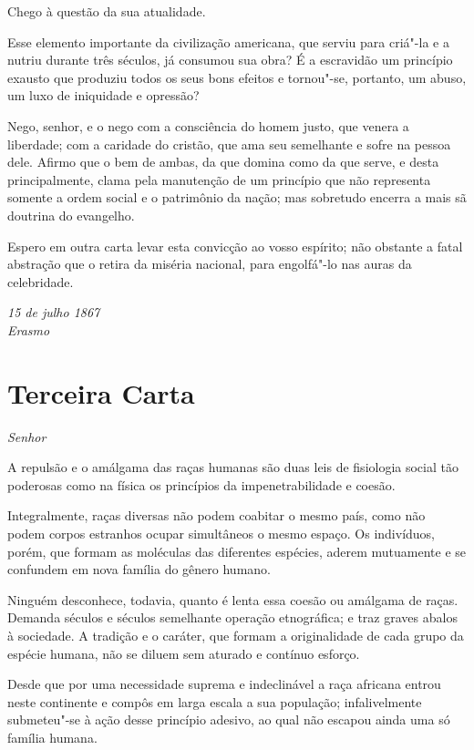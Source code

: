 Chego à questão da sua atualidade.

Esse elemento importante da civilização americana, que serviu para
criá"-la e a nutriu durante três séculos, já consumou sua obra? É a
escravidão um princípio exausto que produziu todos os seus bons efeitos
e tornou"-se, portanto, um abuso, um luxo de iniquidade e opressão?

Nego, senhor, e o nego com a consciência do homem justo, que venera a
liberdade; com a caridade do cristão, que ama seu semelhante e sofre na
pessoa dele. Afirmo que o bem de ambas, da que domina como da que
serve, e desta principalmente, clama pela manutenção de um princípio
que não representa somente a ordem social e o patrimônio da nação; mas
sobretudo encerra a mais sã doutrina do evangelho.

Espero em outra carta levar esta convicção ao vosso espírito; não
obstante a fatal abstração que o retira da miséria nacional, para
engolfá"-lo nas auras da celebridade.

\begin{flushright}
\textit{15 de julho 1867\\
Erasmo}
\end{flushright}

\chapter[Terceira Carta]{Terceira Carta }

\noindent\textit{Senhor}

\sectionitem

A repulsão e o amálgama das raças humanas são duas leis de fisiologia
social tão poderosas como na física os princípios da impenetrabilidade
e coesão.

Integralmente, raças diversas não podem coabitar o mesmo país, como não
podem corpos estranhos ocupar simultâneos o mesmo espaço. Os
indivíduos, porém, que formam as moléculas das diferentes espécies,
aderem mutuamente e se confundem em nova família do gênero humano. 

Ninguém desconhece, todavia, quanto é lenta essa coesão ou amálgama de
raças. Demanda séculos e séculos semelhante operação etnográfica; e
traz graves abalos à sociedade. A tradição e o caráter, que formam a
originalidade de cada grupo da espécie humana, não se diluem sem
aturado e contínuo esforço.

Desde que por uma necessidade suprema e indeclinável a raça africana
entrou neste continente e compôs em larga escala a sua população;
infalivelmente submeteu"-se à ação desse princípio adesivo, ao qual
não escapou ainda uma só família humana.

